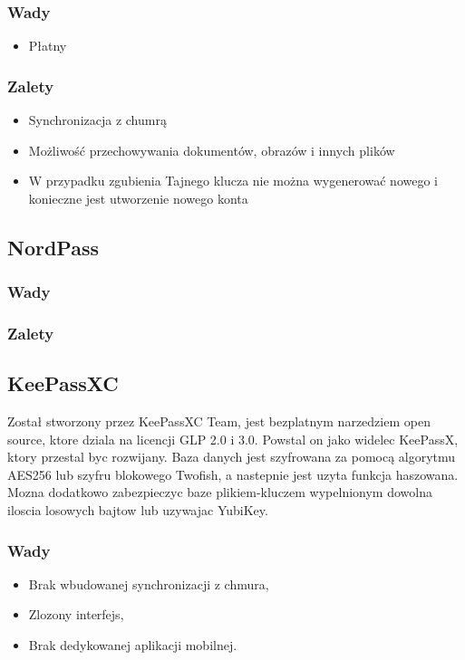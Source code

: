 \subsubsection{Wady}
\begin{itemize}
    \item Płatny
\end{itemize}
\subsubsection{Zalety}
\begin{itemize}
    \item Synchronizacja z chumrą
    \item Możliwość przechowywania dokumentów, obrazów i innych plików
    \item W przypadku zgubienia Tajnego klucza nie można wygenerować nowego i konieczne jest utworzenie nowego konta
\end{itemize}

\subsection{NordPass}
\subsubsection{Wady}
\subsubsection{Zalety}

\subsection{KeePassXC}
Został stworzony przez KeePassXC Team, jest bezplatnym narzedziem open source, ktore dziala na licencji GLP 2.0 i 3.0. Powstal on jako widelec KeePassX, ktory przestal byc rozwijany.
Baza danych jest szyfrowana za pomocą algorytmu AES256 lub szyfru blokowego Twofish, a nastepnie jest uzyta funkcja haszowana. Mozna dodatkowo zabezpieczyc baze plikiem-kluczem wypelnionym dowolna iloscia losowych bajtow lub uzywajac YubiKey. 
\subsubsection{Wady}
\begin{itemize}
    \item Brak wbudowanej synchronizacji z chmura,
    \item Zlozony interfejs,
    \item Brak dedykowanej aplikacji mobilnej.
\end{itemize}

